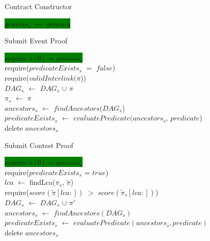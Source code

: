 \begin{algorithm}[H]
    \caption{Contract Constructor}
    \label{algo:avoid_premining_ctor}
    \colorbox{green}{$genesis_{s}$ $\leftarrow$ $genesis$}
    \newline
\end{algorithm}
\vspace{0.1cm}
\begin{algorithm}[H]
    \caption{Submit Event Proof}
    \label{algo:avoid_premining_submit}
    \colorbox{green}{require $\pi[0]$ = $genesis_{s}$ }\\
    require($predicateExists_{s}$ $=$ $false$) \\
    require($validInterlink(\pi$))\\
    $DAG_{s}$ $\leftarrow$ $DAG_{s}$ $\cup$ $\pi$\\
    $\pi_{s}$ $\leftarrow$ $\pi$\\
    $ancestors_{s}$ $\leftarrow$ $findAncestors(DAG_{s}$)\\
    $predicateExists_{s}$ $\leftarrow$ $evaluatePredicate(ancestors_{s}$,
    $predicate$)\\
    delete $ancestors_{s}$\\
\end{algorithm}
\vspace{0.1cm}
\begin{algorithm}
    \caption{Submit Contest Proof}
    \label{algo:avoid_premining_contest}
    \colorbox{green}{require $\tilde\pi[0]$ = $genesis_{s}$ }\\
    require($predicateExists_{s}$ = $true$) \\
    $lca$ $\leftarrow$ findLca($\pi_{s}$, $\tilde\pi$)\\
    require($score(\tilde\pi[lca:])$ $>$ $score(\tilde\pi_{s}[lca:])$) \\
    $DAG_{s}$ $\leftarrow$ $DAG_{s}$ $\cup$ $\pi'$\\
    $ancestors_{s}$ $\leftarrow$ $findAncestors(DAG_{s})$\\
    $predicateExists_{s}$ $\leftarrow$ $evaluatePredicate(ancestors_{s}, predicate)$\\
    delete $ancestors_{s}$\\
\end{algorithm}



